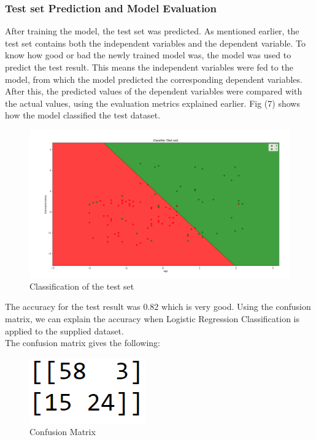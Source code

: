 \documentclass[conference]{IEEEtran}
\begin{document}
\subsubsection{Test set Prediction and Model Evaluation}
After training the model, the test set was predicted. As mentioned earlier, the test set contains both the independent variables and the dependent variable. To know how good or bad the newly trained model was, the model was used to predict the test result. This means the independent variables were fed to the model, from which the model predicted the corresponding dependent variables.
After this, the predicted values of the dependent variables were compared with the actual values, using the evaluation metrics explained earlier. Fig (7) shows
how the model classified the test dataset.

\begin{figure}[h]
    \centering
    \includegraphics[scale=0.21]{figs/classTest.png}
    \caption{Classification of the test set}
    \label{dabc}        
\end{figure}

The accuracy for the test result was 0.82 which is very good. Using the confusion matrix, we can explain the accuracy when Logistic Regression Classification is applied to the supplied dataset.\\
The confusion matrix gives the following:\\
\begin{figure}[h]
    \centering
    \includegraphics[scale=0.71]{figs/matrix.png}
    \caption{Confusion Matrix}
    \label{dabc}        
\end{figure}
\end{document}
